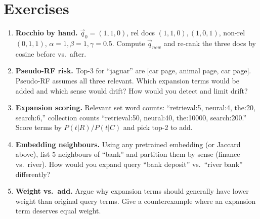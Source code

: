 \section{Exercises}
\begin{enumerate}[label=E6.\arabic*, leftmargin=*, itemsep=0.6em]
  \item \textbf{Rocchio by hand.} $\vec{q}_0=(1,1,0)$, rel docs $(1,1,0),(1,0,1)$, non-rel $(0,1,1)$, $\alpha=1,\beta=1,\gamma=0.5$. Compute $\vec{q}_{new}$ and re-rank the three docs by cosine before vs.\ after.
  \item \textbf{Pseudo-RF risk.} Top-3 for ``jaguar'' are [car page, animal page, car page]. Pseudo-RF assumes all three relevant. Which expansion terms would be added and which sense would drift? How would you detect and limit drift?
  \item \textbf{Expansion scoring.} Relevant set word counts: ``retrieval:5, neural:4, the:20, search:6,'' collection counts ``retrieval:50, neural:40, the:10000, search:200.'' Score terms by $P(t|R)/P(t|C)$ and pick top-2 to add.
  \item \textbf{Embedding neighbours.} Using any pretrained embedding (or Jaccard above), list 5 neighbours of ``bank'' and partition them by sense (finance vs.\ river). How would you expand query ``bank deposit'' vs.\ ``river bank'' differently?
  \item \textbf{Weight vs.\ add.} Argue why expansion terms should generally have lower weight than original query terms. Give a counterexample where an expansion term deserves equal weight.
\end{enumerate}

